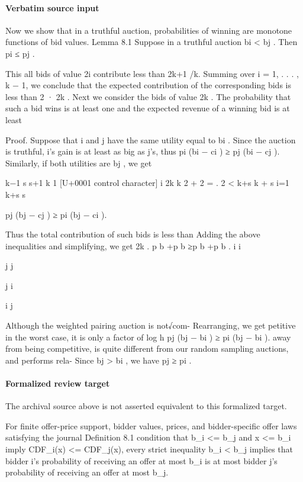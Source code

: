 \documentclass[10pt]{article}
\begin{document}
\paragraph{Verbatim source input}
\begin{ReviewVerbatim}
Now we show that in a truthful auction, probabilities of winning are monotone functions of bid values.
Lemma 8.1 Suppose in a truthful auction bi < bj .
Then pi ≤ pj .

This all bids of value 2i contribute less than 2k+1 /k.
Summing over i = 1, . . . , k − 1, we conclude that
the expected contribution of the corresponding bids
is less than 2 · 2k .
Next we consider the bids of value 2k . The probability that such a bid wins is at least one and the
expected revenue of a winning bid is at least

Proof. Suppose that i and j have the same utility
equal to bi . Since the auction is truthful, i’s gain is
at least as big as j’s, thus
pi (bi − ci ) ≥ pj (bi − cj ).
Similarly, if both utilities are bj , we get

k−1
s
s+1 k
1 [U+0001 control character] i
2k
k
2 +
2 =
.
2 <
k+s
k + s i=1
k+s
s

pj (bj − cj ) ≥ pi (bj − ci ).

Thus the total contribution of such bids is less than Adding the above inequalities and simplifying, we get
2k .
p b +p b ≥p b +p b .
i i

j j

j i

i j

Although the weighted pairing auction is not√com- Rearranging, we get
petitive in the worst case, it is only a factor of log h
pj (bj − bi ) ≥ pi (bj − bi ).
away from being competitive, is quite different from
our random sampling auctions, and performs rela- Since bj > bi , we have pj ≥ pi .
\end{ReviewVerbatim}


\paragraph{Formalized review target}
The archival source above is not asserted equivalent to this formalized target.
\begin{ReviewVerbatim}
For finite offer-price support, bidder values, prices, and bidder-specific offer laws satisfying the journal Definition 8.1 condition that b_i <= b_j and x <= b_i imply CDF_i(x) <= CDF_j(x), every strict inequality b_i < b_j implies that bidder i's probability of receiving an offer at most b_i is at most bidder j's probability of receiving an offer at most b_j.
\end{ReviewVerbatim}
\end{document}
